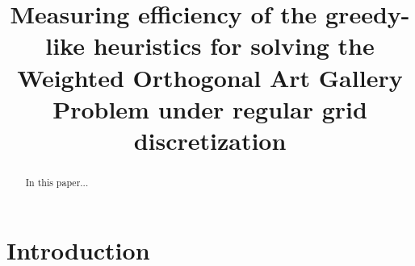 \documentclass[runningheads,a4paper]{elsarticle}
\begin{document}
	
	
	\title{Measuring efficiency of the greedy-like heuristics for solving  the Weighted Orthogonal Art Gallery Problem under regular grid discretization}
	
	
	\begin{abstract}
		In this paper...
	\end{abstract}
	\maketitle
	
	
	\section{Introduction}\label{sec:introduction}
	
\end{document}
